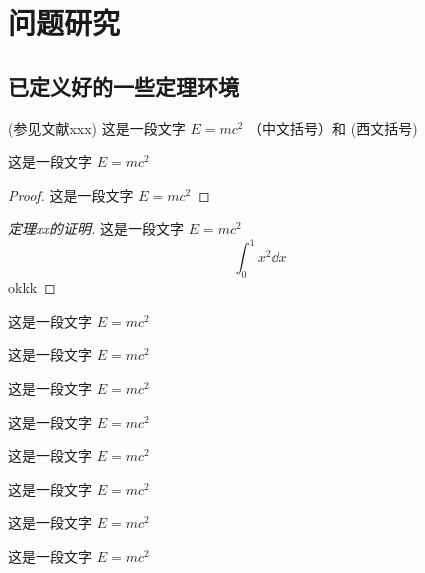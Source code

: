 \chapter{问题研究}


\section{已定义好的一些定理环境}

\begin{definition}[测度]
  (参见文献xxx) 这是一段文字 $E = m c^2$  （中文括号）和 (西文括号)
\end{definition}

\begin{theorem}
  这是一段文字 $E = m c^2$
\end{theorem}

\begin{proof}
  这是一段文字 $E = m c^2$
\end{proof}

\begin{proof}[定理xx的证明]
  这是一段文字 $E = m c^2$
  \[
    \int_{0}^{1} x^2 \dd{x}
  \]
  okkk
\end{proof}

\begin{example}
  这是一段文字 $E = m c^2$
\end{example}

\begin{property}
  这是一段文字 $E = m c^2$
\end{property}

\begin{proposition}
  这是一段文字 $E = m c^2$
\end{proposition}

\begin{corollary}
  这是一段文字 $E = m c^2$
\end{corollary}

\begin{lemma}
  这是一段文字 $E = m c^2$
\end{lemma}

\begin{axiom}
  这是一段文字 $E = m c^2$
\end{axiom}

\begin{antiexample}
  这是一段文字 $E = m c^2$
\end{antiexample}

\begin{conjecture}
  这是一段文字 $E = m c^2$
\end{conjecture}

